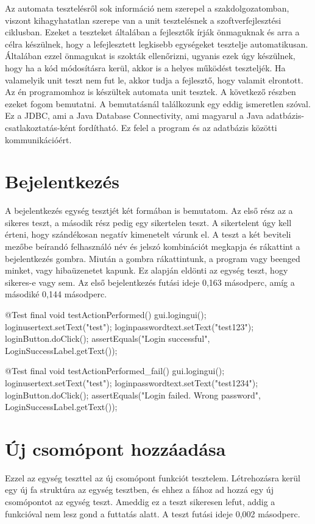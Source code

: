 
Az automata tesztelésről sok információ nem szerepel a szakdolgozatomban, viszont kihagyhatatlan szerepe van a unit tesztelésnek a szoftverfejlesztési ciklusban. Ezeket a teszteket általában a fejlesztők írják önmaguknak és arra a célra készülnek, hogy a lefejlesztett legkisebb egységeket tesztelje automatikusan. Általában ezzel önmagukat is szokták ellenőrizni, ugyanis ezek úgy készülnek, hogy ha a kód módosításra kerül, akkor is a helyes működést teszteljék. Ha valamelyik unit teszt nem fut le, akkor tudja a fejlesztő, hogy valamit elrontott.\\

Az én programomhoz is készültek automata unit tesztek. A következő részben ezeket fogom bemutatni. A bemutatásnál találkozunk egy eddig ismeretlen szóval. Ez a JDBC, ami a Java Database Connectivity, ami magyarul a Java adatbázis-csatlakoztatás-ként fordítható. Ez felel a program és az adatbázis közötti kommunikációért.

\section{Bejelentkezés} A bejelentkezés egység tesztjét két formában is bemutatom. Az első rész az a sikeres teszt, a második rész pedig egy sikertelen teszt. A sikertelent úgy kell érteni, hogy szándékosan negatív kimenetelt várunk el. A teszt a két beviteli mezőbe beírandó felhasználó név és jelszó kombinációt megkapja és rákattint a bejelentkezés gombra. Miután a gombra rákattintunk, a program vagy beenged minket, vagy hibaüzenetet kapunk. Ez alapján eldönti az egység teszt, hogy sikeres-e vagy sem. Az első bejelentkezés futási ideje 0,163 másodperc, amíg a másodiké 0,144 másodperc.

\begin{java}
@Test
final void testActionPerformed() {
	gui.logingui();
	loginusertext.setText("test");
	loginpasswordtext.setText("test123");
	loginButton.doClick();
	assertEquals("Login successful",
	LoginSuccessLabel.getText());
}

@Test
final void testActionPerformed_fail() {
	gui.logingui();
	loginusertext.setText("test");
	loginpasswordtext.setText("test1234");
	loginButton.doClick();
	assertEquals("Login failed. Wrong password",
	LoginSuccessLabel.getText());
}	
\end{java}

\section{Új csomópont hozzáadása} Ezzel az egység teszttel az új csomópont funkciót tesztelem. Létrehozásra kerül egy új fa struktúra az egység tesztben, és ehhez a fához ad hozzá egy új csomópontot az egység teszt. Ameddig ez a teszt sikeresen lefut, addig a funkcióval nem lesz gond a futtatás alatt. A teszt futási ideje 0,002 másodperc.


